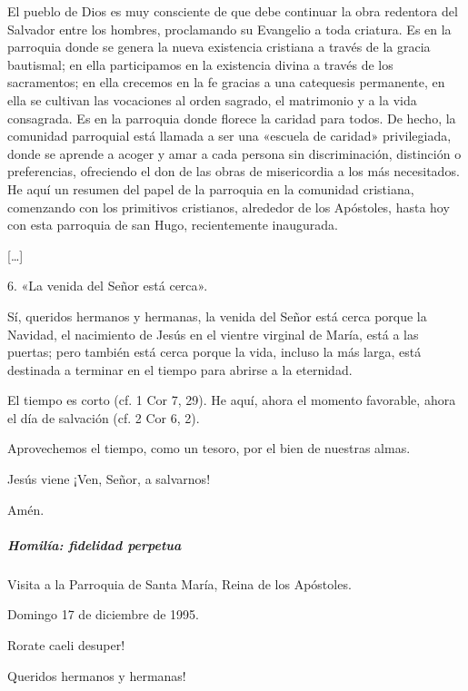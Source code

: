 \documentclass[]{article}
\let\oldsubparagraph\subparagraph
\renewcommand{\subparagraph}[1]{\oldsubparagraph{#1}\mbox{}}
\begin{document}
El pueblo de Dios es muy consciente de que debe continuar la obra
redentora del Salvador entre los hombres, proclamando su Evangelio a
toda criatura. Es en la parroquia donde se genera la nueva existencia
cristiana a través de la gracia bautismal; en ella participamos en la
existencia divina a través de los sacramentos; en ella crecemos en la fe
gracias a una catequesis permanente, en ella se cultivan las vocaciones
al orden sagrado, el matrimonio y a la vida consagrada. Es en la
parroquia donde florece la caridad para todos. De hecho, la comunidad
parroquial está llamada a ser una «escuela de caridad» privilegiada,
donde se aprende a acoger y amar a cada persona sin discriminación,
distinción o preferencias, ofreciendo el don de las obras de
misericordia a los más necesitados. He aquí un resumen del papel de la
parroquia en la comunidad cristiana, comenzando con los primitivos
cristianos, alrededor de los Apóstoles, hasta hoy con esta parroquia de
san Hugo, recientemente inaugurada.

{[}\ldots{}{]}

6. «La venida del Señor está cerca».

Sí, queridos hermanos y hermanas, la venida del Señor está cerca porque
la Navidad, el nacimiento de Jesús en el vientre virginal de María, está
a las puertas; pero también está cerca porque la vida, incluso la más
larga, está destinada a terminar en el tiempo para abrirse a la
eternidad.

El tiempo es corto (cf. 1 Cor 7, 29). He aquí, ahora el momento
favorable, ahora el día de salvación (cf. 2 Cor 6, 2).

Aprovechemos el tiempo, como un tesoro, por el bien de nuestras almas.

Jesús viene ¡Ven, Señor, a salvarnos!

Amén.

\subparagraph{Homilía: fidelidad
perpetua}\label{homiluxeda-fidelidad-perpetua}

Visita a la Parroquia de Santa María, Reina de los Apóstoles. 

Domingo 17 de diciembre de 1995.

Rorate caeli desuper!

Queridos hermanos y hermanas!
\end{document}
